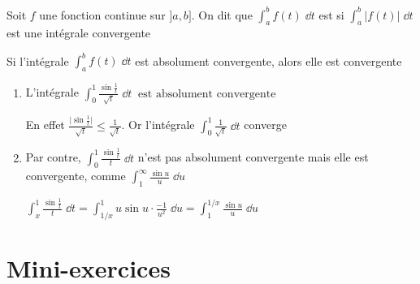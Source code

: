 \begin{frame}

\begin{mydefinition}
Soit $f$ une fonction continue sur $]a,b]$. On dit que $\int_a^b f(t)\;\dd t$ est  si 
$\int_a^b \big|f(t)\big|\;\dd t$ est une intégrale convergente
\end{mydefinition}

\pause


\begin{theoreme}
Si l'intégrale $\int_a^b f(t)\;\dd t$ est absolument convergente,
alors elle est convergente
\end{theoreme}
\pause

\begin{exemple}
\begin{enumerate}
  \item L'intégrale $\int_0^1 \frac{\sin\frac1t}{\sqrt{t}}\;\dd t\ \text{ est absolument convergente}$

 \pause 
En effet $\frac{\big|\sin\frac1t\big|}{\sqrt{t}}\le \frac{1}{\sqrt{t}}$.
\pause Or l'intégrale $\int_0^1 \frac{1}{\sqrt{t}}\;\dd t$
converge

\pause
  
  \item Par contre, 
$
\int_0^1 \frac{\sin\frac1t}{t}\;\dd t$ n'est pas absolument convergente mais elle est convergente,
comme $\int_1^{\infty} \frac{\sin u}{u}\;\dd u$

\pause
\centerline{$
\int_x^1 \frac{\sin\frac1t}{t}\;\dd t = 
\int_{1/x}^1 u\sin u \cdot \frac{-1}{u^2}\;\dd u = 
\int_1^{1/x} \frac{\sin u}{u}\;\dd u
$}
\end{enumerate}
\vspace*{-2ex} 
\end{exemple}

\end{frame}

 \section*{Mini-exercices}


